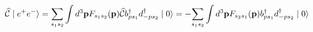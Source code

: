 \begin{equation*}
\widehat{\mathcal{C}}\mid e^{+}e^{-}\rangle =\underset{s_{1}s_{2}}{\sum }%
\int d^{3}\mathbf{p}F_{s_{1}s_{2}}(\mathbf{p})\widehat{\mathcal{C}}%
b_{ps_{1}}^{\dagger }d_{-ps_{2}}^{\dagger }\mid 0\rangle =-\underset{%
s_{1}s_{2}}{\sum }\int d^{3}\mathbf{p}F_{s_{2}s_{1}}(\mathbf{p}%
)b_{ps_{1}}^{\dagger }d_{-ps_{2}}^{\dagger }\mid 0\rangle
\end{equation*}

